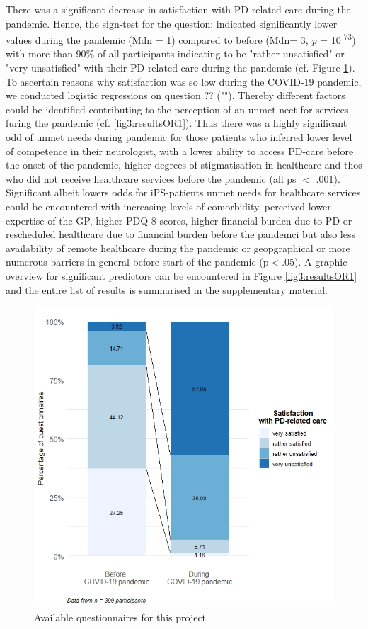 \documentclass{bmcart}
\begin{document}
There was a significant decrease in satisfaction with PD-related care during the pandemic. Hence, the sign-test for the question: %
indicated significantly lower values during the pandemic (Mdn = 1) compared to before (Mdn= 3, \textit{p} = 10\textsuperscript{-73}) with more than 90\% of all participants indicating to be "rather unsatisfied" or "very unsatisfied" with their PD-related care during the pandemic (cf. Figure \ref{fig2:satisfaction}). To ascertain reasons why satisfaction was so low during the \textsc{COVID}-19 pandemic, we conducted logistic regressions on question ?? (""). Thereby different factors could be identified contributing to the perception of an unmet neet for services furing the pandemic (cf. \ref{fig3:resultsOR1}). Thus there was a highly significant odd of unmet needs during pandemic for those patients who inferred lower level of competence in their neurologist, with a lower ability to access PD-care before the onset of the pandemic, higher degrees of stigmatisation in healthcare and thos who did not receive healthcare services before the pandemic (all ps $<$ .001). Significant albeit lowers odds for iPS-patients unmet needs for healthcare services could be encountered with increasing levels of comorbidity, perceived lower expertise of the GP, higher PDQ-8 scores, higher financial burden due to PD or rescheduled healthcare due to financial burden before the pandemci but also less availability of remote healthcare during the pandemic or geopgraphical or more numerous barriers in general before start of the pandemic (p$<$.05). A graphic overview for significant predictors can be encountered in Figure \ref{fig3:resultsOR1} and the entire list of results is summarised in the supplementary material. %

\begin{figure}
\centering
\includegraphics[width=.90\textwidth]{fig2.satisfaction.care.v1.0.jpeg}
\caption{Available questionnaires for this project}
\label{fig2:satisfaction}
\end{figure}
\end{document}
